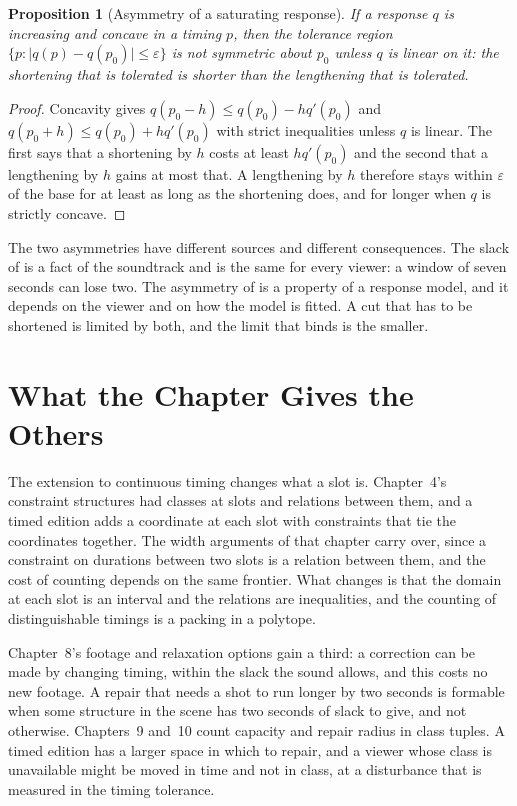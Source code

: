 \documentclass[11pt,twoside,openright]{book}
\theoremstyle{plain}
\newtheorem{proposition}[theorem]{Proposition}
\theoremstyle{definition}
\theoremstyle{remark}
\begin{document}
\begin{proposition}[Asymmetry of a saturating response]\label{prop:asym}
If a response $q$ is increasing and concave in a timing $p$, then the tolerance region $\{p:\lvert q(p)-q(p_0)\rvert\le\varepsilon\}$ is not symmetric about $p_0$ unless $q$ is linear on it: the shortening that is tolerated is shorter than the lengthening that is tolerated.
\end{proposition}

\begin{proof}
Concavity gives $q(p_0-h)\le q(p_0)-hq'(p_0)$ and $q(p_0+h)\le q(p_0)+hq'(p_0)$ with strict inequalities unless $q$ is linear. The first says that a shortening by $h$ costs at least $hq'(p_0)$ and the second that a lengthening by $h$ gains at most that. A lengthening by $h$ therefore stays within $\varepsilon$ of the base for at least as long as the shortening does, and for longer when $q$ is strictly concave.
\end{proof}

The two asymmetries have different sources and different consequences. The slack of  is a fact of the soundtrack and is the same for every viewer: a window of seven seconds can lose two. The asymmetry of  is a property of a response model, and it depends on the viewer and on how the model is fitted. A cut that has to be shortened is limited by both, and the limit that binds is the smaller.

\section{What the Chapter Gives the Others}\label{sec:gives6}

The extension to continuous timing changes what a slot is. Chapter~4's constraint structures had classes at slots and relations between them, and a timed edition adds a coordinate at each slot with constraints that tie the coordinates together. The width arguments of that chapter carry over, since a constraint on durations between two slots is a relation between them, and the cost of counting depends on the same frontier. What changes is that the domain at each slot is an interval and the relations are inequalities, and the counting of distinguishable timings is a packing in a polytope.

Chapter~8's footage and relaxation options gain a third: a correction can be made by changing timing, within the slack the sound allows, and this costs no new footage. A repair that needs a shot to run longer by two seconds is formable when some structure in the scene has two seconds of slack to give, and not otherwise. Chapters~9 and~10 count capacity and repair radius in class tuples. A timed edition has a larger space in which to repair, and a viewer whose class is unavailable might be moved in time and not in class, at a disturbance that is measured in the timing tolerance.
\end{document}
